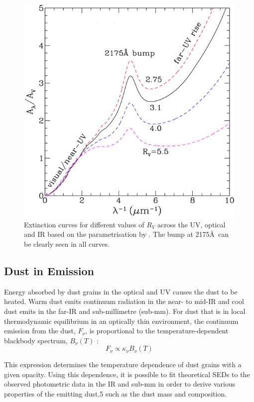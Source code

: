 \begin{figure}
\centering
\includegraphics[clip=true,scale=1,trim= 0 0 0 0]{chapters/chapter1/figs/extinction_curves.png}
\caption{Extinction curves for different values of $R_V$ across the UV, optical and IR based on the parametrisation by \citet{Cardelli1989} .  The bump at 2175\AA\ can be clearly seen in all curves.}
\label{fig:ext_curve}
\end{figure}

\subsection{Dust in Emission}

Energy absorbed by dust grains in the optical and UV causes the dust to be heated.  Warm dust emits continuum radiation in the near- to mid-IR and cool dust emits in the far-IR and sub-millimetre (sub-mm).  For dust that is in local thermodynamic equilibrium in an optically thin environment, the continuum emission from the dust, $F_{\nu}$,  is proportional to the temperature-dependent blackbody spectrum, $B_{\nu}(T)$ \citep{Hildebrand1983}:
\begin{equation}
F_{\nu}\propto \kappa_{\nu} B_{\nu}(T)
\end{equation}

This expression determines the temperature dependence of dust grains with a given opacity. Using this dependence, it is possible to fit theoretical SEDs to the observed photometric data in the IR and sub-mm in order to derive various properties of the emitting dust,5
 such as the dust mass and composition.  


